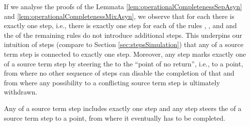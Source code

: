 \documentclass[]{llncs}
\begin{document}
If we analyse the proofs of the Lemmata \ref{lem:operationalCompletenessSepAsyn} and \ref{lem:operationalCompletenessMixAsyn}, we observe that for each \simulation there is exactly one \nonAdmin step, i.e., there is exactly one \nonAdmin step for each of the rules , , and  and the \simulation of the remaining rules do not introduce additional \nonAdmin steps. This underpins our intuition of \nonAdmin steps (compare to Section \ref{sec:stepsSimulation}) that any \simulation of a source term step is connected to exactly one \nonAdmin step. Moreover, any \nonAdmin step marks exactly one \simulation of a source term step by steering the \simulation to the ``point of no return'', i.e., to a point, from where no other sequence of steps can disable the completion of that \simulation and from where any possibility to \simulate a conflicting source term step is ultimately withdrawn.

\begin{lemma} \label{lem:simulationVSNonAdminStep}
	Any \simulation of a source term step includes exactly one \nonAdmin step and any \nonAdmin step steers the \simulation of a source term step to a point, from where it eventually has to be completed.
\end{lemma}
\end{document}
